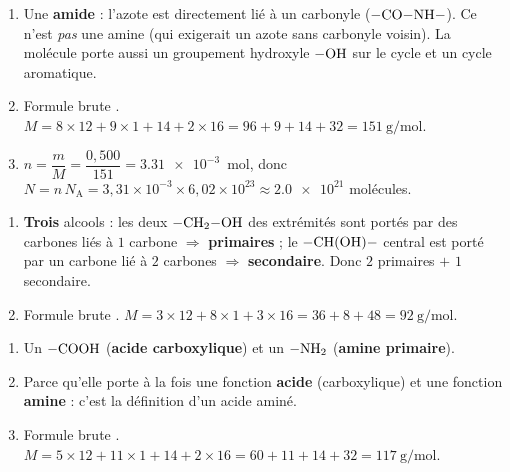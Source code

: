 \documentclass[11pt,a4paper]{article}
\begin{document}
\begin{corrige}
\begin{enumerate}[label=\alph*)]
  \item Une \textbf{amide} : l'azote est directement lié à un carbonyle ($-\ce{CO-NH}-$). Ce n'est \emph{pas} une amine (qui exigerait un azote sans carbonyle voisin). La molécule porte aussi un groupement hydroxyle $-\ce{OH}$ sur le cycle et un cycle aromatique.
  \item Formule brute . $M=8\times12+9\times1+14+2\times16=96+9+14+32=\qty{151}{\gram\per\mole}$.
  \item $n=\dfrac{m}{M}=\dfrac{0,500}{151}=\num{3.31e-3}$~mol, donc
  $N=n\,N_{\mathrm{A}}=3{,}31\times10^{-3}\times6{,}02\times10^{23}\approx\num{2.0e21}$ molécules.
\end{enumerate}
\end{corrige}

\begin{corrige}
\begin{enumerate}[label=\alph*)]
  \item \textbf{Trois} alcools : les deux $-\ce{CH2-OH}$ des extrémités sont portés par des carbones liés à $1$ carbone $\Rightarrow$ \textbf{primaires} ; le $-\ce{CH(OH)}-$ central est porté par un carbone lié à $2$ carbones $\Rightarrow$ \textbf{secondaire}. Donc $2$ primaires $+$ $1$ secondaire.
  \item Formule brute . $M=3\times12+8\times1+3\times16=36+8+48=\qty{92}{\gram\per\mole}$.
\end{enumerate}
\end{corrige}

\begin{corrige}
\begin{enumerate}[label=\alph*)]
  \item Un $-\ce{COOH}$ (\textbf{acide carboxylique}) et un $-\ce{NH2}$ (\textbf{amine primaire}).
  \item Parce qu'elle porte à la fois une fonction \textbf{acide} (carboxylique) et une fonction \textbf{amine} : c'est la définition d'un acide aminé.
  \item Formule brute . $M=5\times12+11\times1+14+2\times16=60+11+14+32=\qty{117}{\gram\per\mole}$.
\end{enumerate}
\end{corrige}
\end{document}
